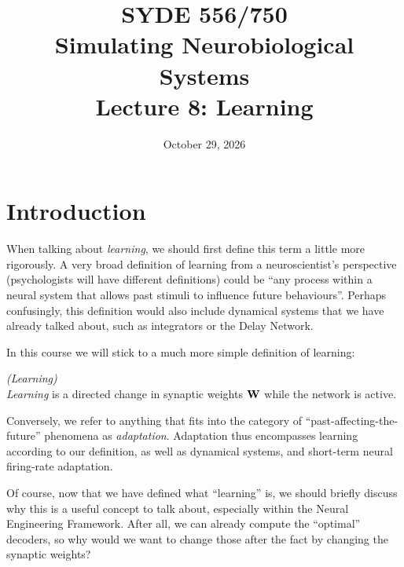 \documentclass[10pt,letterpaper,oneside]{article}
\date{October 29, 2026}
\title{SYDE 556/750 \\ Simulating Neurobiological Systems \\ Lecture 8: Learning}
\begin{document}

\section{Introduction}


When talking about \emph{learning}, we should first define this term a little more rigorously. A very broad definition of learning from a neuroscientist's perspective (psychologists will have different definitions) could be \enquote{any process within a neural system that allows past stimuli to influence future behaviours}. Perhaps confusingly, this definition would also include dynamical systems that we have already talked about, such as integrators or the Delay Network.

In this course we will stick to a much more simple definition of learning:
\begin{mdframed}
	\hfill\emph{(Learning)}\\
	\emph{Learning} is a directed change in synaptic weights ${\mathbf{W}}$ while the network is active.
\end{mdframed}
Conversely, we refer to anything that fits into the category of \enquote{past-affecting-the-future} phenomena as \emph{adaptation}. Adaptation thus encompasses learning according to our definition, as well as dynamical systems, and short-term neural firing-rate adaptation.

Of course, now that we have defined what \enquote{learning} is, we should briefly discuss why this is a useful concept to talk about, especially within the Neural Engineering Framework. After all, we can already compute the \enquote{optimal} decoders, so why would we want to change those after the fact by changing the synaptic weights?
\end{document}
